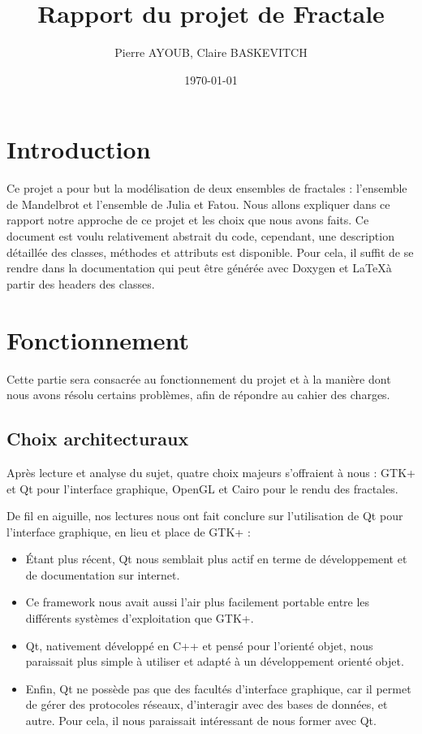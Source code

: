 \documentclass[11pt]{article}
\title{Rapport du projet de Fractale}
\author{Pierre AYOUB, Claire BASKEVITCH}
\date\today
\begin{document}
\maketitle

\section{Introduction}

Ce projet a pour but la modélisation de deux ensembles de fractales : l'ensemble
de Mandelbrot et l'ensemble de Julia et Fatou. Nous allons expliquer dans ce
rapport notre approche de ce projet et les choix que nous avons faits. Ce
document est voulu relativement abstrait du code, cependant, une description
détaillée des classes, méthodes et attributs est disponible. Pour cela, il
suffit de se rendre dans la documentation qui peut être générée avec Doxygen et
\LaTeX à partir des headers des classes.

\section{Fonctionnement}

Cette partie sera consacrée au fonctionnement du projet et à la manière dont
nous avons résolu certains problèmes, afin de répondre au cahier des charges.

\subsection{Choix architecturaux}

Après lecture et analyse du sujet, quatre choix majeurs s'offraient à nous :
GTK+ et Qt pour l'interface graphique, OpenGL et Cairo pour le rendu des
fractales.

De fil en aiguille, nos lectures nous ont fait conclure sur
l'utilisation de Qt pour l'interface graphique, en lieu et place de GTK+ :
\begin{itemize}
    \item Étant plus récent, Qt nous semblait plus actif en terme de
        développement et de documentation sur internet.
    \item Ce framework nous avait aussi l'air plus facilement portable entre les
        différents systèmes d'exploitation que GTK+.
    \item Qt, nativement développé en C++ et pensé pour l'orienté objet, nous
        paraissait plus simple à utiliser et adapté à un développement orienté
        objet.
    \item Enfin, Qt ne possède pas que des facultés d'interface graphique, car
        il permet de gérer des protocoles réseaux, d'interagir avec des bases de
        données, et autre. Pour cela, il nous paraissait intéressant de nous
        former avec Qt.
\end{itemize}
\end{document}
